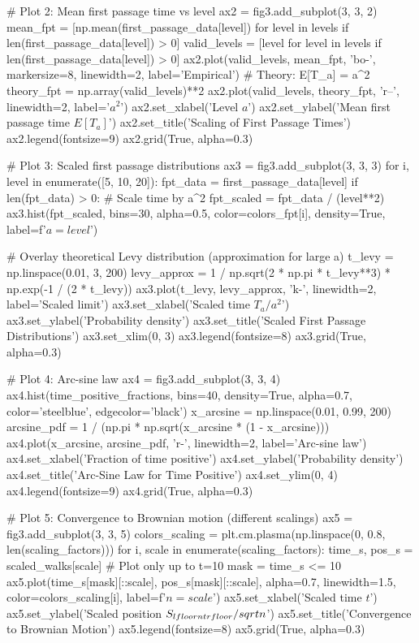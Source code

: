 \documentclass[a4paper, 11pt]{article}
\begin{document}
\begin{pycode}
# Plot 2: Mean first passage time vs level
ax2 = fig3.add_subplot(3, 3, 2)
mean_fpt = [np.mean(first_passage_data[level]) for level in levels if len(first_passage_data[level]) > 0]
valid_levels = [level for level in levels if len(first_passage_data[level]) > 0]
ax2.plot(valid_levels, mean_fpt, 'bo-', markersize=8, linewidth=2, label='Empirical')
# Theory: E[T_a] = a^2
theory_fpt = np.array(valid_levels)**2
ax2.plot(valid_levels, theory_fpt, 'r--', linewidth=2, label='$a^2$')
ax2.set_xlabel('Level $a$')
ax2.set_ylabel('Mean first passage time $E[T_a]$')
ax2.set_title('Scaling of First Passage Times')
ax2.legend(fontsize=9)
ax2.grid(True, alpha=0.3)

# Plot 3: Scaled first passage distributions
ax3 = fig3.add_subplot(3, 3, 3)
for i, level in enumerate([5, 10, 20]):
    fpt_data = first_passage_data[level]
    if len(fpt_data) > 0:
        # Scale time by a^2
        fpt_scaled = fpt_data / (level**2)
        ax3.hist(fpt_scaled, bins=30, alpha=0.5, color=colors_fpt[i],
                 density=True, label=f'$a={level}$')

# Overlay theoretical Levy distribution (approximation for large a)
t_levy = np.linspace(0.01, 3, 200)
levy_approx = 1 / np.sqrt(2 * np.pi * t_levy**3) * np.exp(-1 / (2 * t_levy))
ax3.plot(t_levy, levy_approx, 'k-', linewidth=2, label='Scaled limit')
ax3.set_xlabel('Scaled time $T_a / a^2$')
ax3.set_ylabel('Probability density')
ax3.set_title('Scaled First Passage Distributions')
ax3.set_xlim(0, 3)
ax3.legend(fontsize=8)
ax3.grid(True, alpha=0.3)

# Plot 4: Arc-sine law
ax4 = fig3.add_subplot(3, 3, 4)
ax4.hist(time_positive_fractions, bins=40, density=True, alpha=0.7,
         color='steelblue', edgecolor='black')
x_arcsine = np.linspace(0.01, 0.99, 200)
arcsine_pdf = 1 / (np.pi * np.sqrt(x_arcsine * (1 - x_arcsine)))
ax4.plot(x_arcsine, arcsine_pdf, 'r-', linewidth=2, label='Arc-sine law')
ax4.set_xlabel('Fraction of time positive')
ax4.set_ylabel('Probability density')
ax4.set_title('Arc-Sine Law for Time Positive')
ax4.set_ylim(0, 4)
ax4.legend(fontsize=9)
ax4.grid(True, alpha=0.3)

# Plot 5: Convergence to Brownian motion (different scalings)
ax5 = fig3.add_subplot(3, 3, 5)
colors_scaling = plt.cm.plasma(np.linspace(0, 0.8, len(scaling_factors)))
for i, scale in enumerate(scaling_factors):
    time_s, pos_s = scaled_walks[scale]
    # Plot only up to t=10
    mask = time_s <= 10
    ax5.plot(time_s[mask][::scale], pos_s[mask][::scale], alpha=0.7,
             linewidth=1.5, color=colors_scaling[i], label=f'$n={scale}$')
ax5.set_xlabel('Scaled time $t$')
ax5.set_ylabel('Scaled position $S_{\\lfloor nt \\rfloor}/\\sqrt{n}$')
ax5.set_title('Convergence to Brownian Motion')
ax5.legend(fontsize=8)
ax5.grid(True, alpha=0.3)


\end{pycode}
\end{document}
